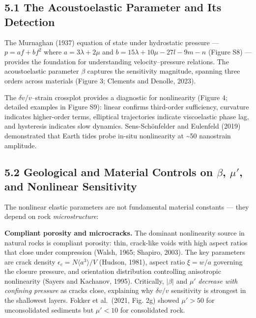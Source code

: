 \documentclass[12pt]{article}
\begin{document}
\subsection{5.1 The Acoustoelastic Parameter and Its
Detection}\label{the-acoustoelastic-parameter-and-its-detection}

The Murnaghan (1937) equation of state under hydrostatic pressure ---
\(p = af + bf^2\) where \(a = 3\lambda + 2\mu\) and
\(b = 15\lambda + 10\mu - 27l - 9m - n\) (Figure S8) --- provides the
foundation for understanding velocity--pressure relations. The
acoustoelastic parameter \(\beta\) captures the sensitivity magnitude,
spanning three orders across materials (Figure 3; Clements and Denolle,
2023).

The \(\delta v/v\)--strain crossplot provides a diagnostic for
nonlinearity (Figure 4; detailed examples in Figure S9): linear confirms
third-order sufficiency, curvature indicates higher-order terms,
elliptical trajectories indicate viscoelastic phase lag, and hysteresis
indicates slow dynamics. Sens-Schönfelder and Eulenfeld (2019)
demonstrated that Earth tides probe in-situ nonlinearity at
\textasciitilde{}50 nanostrain amplitude.

\subsection{\texorpdfstring{5.2 Geological and Material Controls on
\(\beta\), \(\mu'\), and Nonlinear
Sensitivity}{5.2 Geological and Material Controls on \textbackslash beta, \textbackslash mu\textquotesingle, and Nonlinear Sensitivity}}\label{geological-and-material-controls-on-beta-mu-and-nonlinear-sensitivity}

The nonlinear elastic parameters are not fundamental material constants
--- they depend on rock \emph{microstructure}:

\textbf{Compliant porosity and microcracks.} The dominant nonlinearity
source in natural rocks is compliant porosity: thin, crack-like voids
with high aspect ratios that close under compression (Walsh, 1965;
Shapiro, 2003). The key parameters are crack density
\(\epsilon_c = N\langle a^3\rangle/V\) (Hudson, 1981), aspect ratio
\(\xi = w/a\) governing the closure pressure, and orientation
distribution controlling anisotropic nonlinearity (Sayers and Kachanov,
1995). Critically, \(|\beta|\) and \(\mu'\) \emph{decrease with
confining pressure} as cracks close, explaining why \(\delta v/v\)
sensitivity is strongest in the shallowest layers. Fokker et al.~(2021,
Fig. 2g) showed \(\mu' > 50\) for unconsolidated sediments but
\(\mu' < 10\) for consolidated rock.
\end{document}
